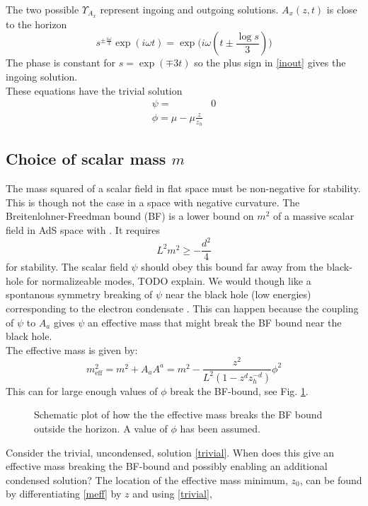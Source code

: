 \documentclass[12pt]{report}
\renewcommand{\i}{\ensuremath{i}}
\newcommand{\At}{\ensuremath{{\phi}}}
\begin{document}
The two possible $\Upsilon_{A_x}$ represent ingoing and outgoing solutions. $A_x(z,t)$ is close to the horizon
\begin{equation}
 s^{\pm\frac{\i\omega}{3}}\exp(\i\omega t)=\exp\big(\i\omega(t\pm\frac{\log s}{3})\big)
\end{equation}
The phase is constant for $s=\exp(\mp3t)$ so the plus sign in \eqref{inout} gives the ingoing solution.
\\These equations have the trivial solution
\begin{equation}
 \begin{split}
  \psi=&0\\
  \At=\mu-\mu\frac{z}{z_h}\label{trivial}
 \end{split}
\end{equation}

\subsection{Choice of scalar mass $m$}
The mass squared of a scalar field in flat space must be non-negative for stability. This is though not the case in a space with negative curvature. The Breitenlohner-Freedman bound (BF) is a lower bound on $m^2$ of a massive scalar field in AdS space with . It requires
\begin{equation}
 L^2m^2\geq-\frac{d^2}{4}\label{BF}
\end{equation}
for stability\cite{Kleban:2004bv}. The scalar field $\psi$ should obey this bound far away from the black-hole for normalizeable modes, TODO explain. We would though like a spontanous symmetry breaking of $\psi$ near the black hole (low energies) corresponding to the electron condensate \cite{Gubser:2008px}. This can happen because the coupling of $\psi$ to $A_a$ gives $\psi$ an effective mass that might break the BF bound near the black hole. \\The effective mass is given by:
\begin{equation}
 m_{\mathrm{eff}}^2=m^2+A_aA^a
=m^2-\frac{z^2}{L^2(1-z^dz_h^{-d})}\At^2
\label{meff}
\end{equation}
This can for large enough values of $\At$ break the BF-bound, see Fig. \ref{BF}.
\begin{figure}
\centering

\caption{Schematic plot of how the the effective mass breaks the BF bound outside the horizon. A value of $\At$ has been assumed.\label{BF}}
\end{figure}
Consider the trivial, uncondensed, solution \eqref{trivial}. When does this give an effective mass breaking the BF-bound and possibly enabling an additional condensed solution? The location of the effective mass minimum, $z_0$, can be found by differentiating \eqref{meff} by $z$ and using \eqref{trivial},
\end{document}
